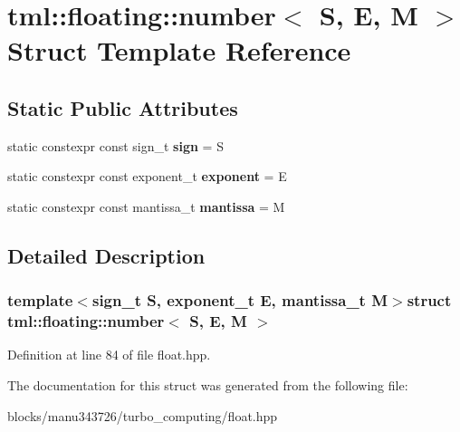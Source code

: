 \hypertarget{structtml_1_1floating_1_1number}{\section{tml\+:\+:floating\+:\+:number$<$ S, E, M $>$ Struct Template Reference}
\label{structtml_1_1floating_1_1number}
}
\subsection*{Static Public Attributes}
\begin{DoxyCompactItemize}
\item 
\hypertarget{structtml_1_1floating_1_1number_a3a3ca7d08b197d058ff4f0915c9f625b}{static constexpr const sign\+\_\+t {\bfseries sign} = S}\label{structtml_1_1floating_1_1number_a3a3ca7d08b197d058ff4f0915c9f625b}

\item 
\hypertarget{structtml_1_1floating_1_1number_ab2b87c7a3f0c0c3a8164b0e2013531e0}{static constexpr const exponent\+\_\+t {\bfseries exponent} = E}\label{structtml_1_1floating_1_1number_ab2b87c7a3f0c0c3a8164b0e2013531e0}

\item 
\hypertarget{structtml_1_1floating_1_1number_a76c21bb7844929c8c408e59629e7e3ec}{static constexpr const mantissa\+\_\+t {\bfseries mantissa} = M}\label{structtml_1_1floating_1_1number_a76c21bb7844929c8c408e59629e7e3ec}

\end{DoxyCompactItemize}


\subsection{Detailed Description}
\subsubsection*{template$<$sign\+\_\+t S, exponent\+\_\+t E, mantissa\+\_\+t M$>$struct tml\+::floating\+::number$<$ S, E, M $>$}



Definition at line 84 of file float.\+hpp.



The documentation for this struct was generated from the following file\+:\begin{DoxyCompactItemize}
\item 
blocks/manu343726/turbo\+\_\+computing/float.\+hpp\end{DoxyCompactItemize}
